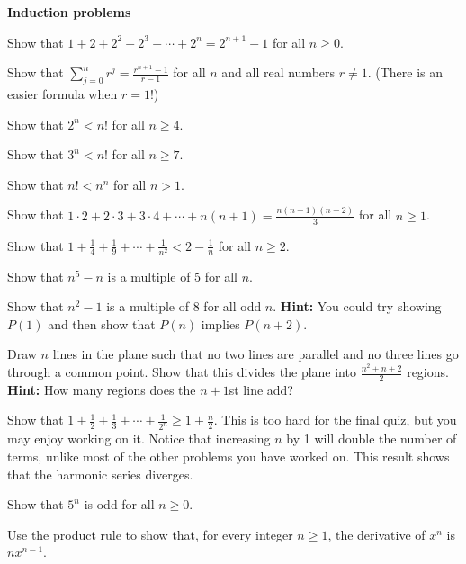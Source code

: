 

\vspace{0.2in}

\noindent
{\bf Induction problems}
\blist{0.2in}
\item Show that $1 + 2 + 2^2 + 2^3 + \cdots + 2^n = 2^{n+1} - 1$ for all $n \geq 0$.
\item Show that $\sum_{j=0}^n r^j = \frac{r^{n+1} - 1}{r-1}$ for all $n$ and all real numbers $r \ne 1$.  (There is an easier formula when $r = 1!$)
\item Show that $2^n < n!$ for all $n \geq 4$.
\item Show that $3^n < n!$ for all $n \geq 7$.
\item Show that $n! < n^n$ for all $n > 1$.
\item Show that $1\cdot 2 + 2\cdot 3 +3 \cdot 4 + \cdots + n(n+1) = \frac{n(n+1)(n+2)}{3}$ for all $n \geq 1$.
\item Show that $1 + \frac{1}{4} + \frac{1}{9} + \cdots + \frac{1}{n^2} < 2-\frac{1}{n}$ for all $n \geq 2$.
\item Show that $n^5 - n$ is a multiple of 5 for all $n$.
\item Show that $n^2 - 1$ is a multiple of 8 for all odd $n$.
{\bf Hint:} You could try showing $P(1)$ and then show that $P(n)$ implies $P(n+2)$.
\item Draw $n$ lines in the plane such that no two lines are parallel and no three lines go through a common point.
Show that this divides the plane into $\frac{n^2+n+2}{2}$ regions.
{\bf Hint:} How many regions does the $n+1$st line add?
\item Show that $1 + \frac{1}{2} + \frac{1}{3} + \cdots + \frac{1}{2^n} \geq 1 + \frac{n}{2}$.  This is too hard for the final quiz, but you may enjoy working on it.  Notice that increasing $n$ by 1 will double the number of terms, unlike most of the other problems you have worked on.
This result shows that the harmonic series diverges.
\item Show that $5^n$ is odd for all $n \geq 0$.
\item Use the product rule to show that, for every integer $n \geq 1$, the derivative of $x^n$ is $n x^{n-1}$.
\elist

